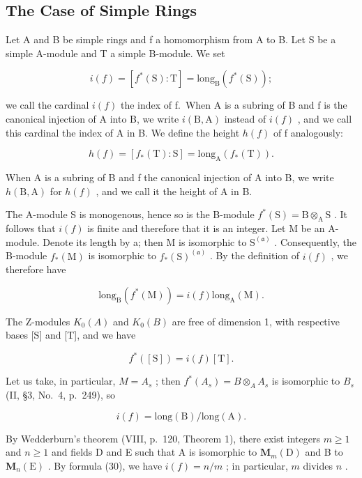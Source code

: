 \subsection{The Case of Simple Rings}

Let A and B be simple rings and f a homomorphism from A to B. Let S be a simple A-module and T a simple B-module. We set

\[
i (f) = [ f ^ {*} (\mathrm{S}): \mathrm{T} ] = \mathrm{long} _ {\mathrm{B}} (f ^ {*} (\mathrm{S}));\tag{26}
\]

we call the cardinal \(i(f)\) the index of f.~When A is a subring of B and f is the canonical injection of A into B, we write \(i(\mathrm{B},\mathrm{A})\) instead of \(i(f)\) , and we call this cardinal the index of A in B. We define the height \(h(f)\) of f analogously:

\[
h (f) = [ f _ {*} (\mathrm{T}): \mathrm{S} ] = \mathrm{long} _ {\mathrm{A}} (f _ {*} (\mathrm{T})).\tag{27}
\]

When A is a subring of B and f the canonical injection of A into B, we write \(h(\mathrm{B}, \mathrm{A})\) for \(h(f)\) , and we call it the height of A in B.

The A-module S is monogenous, hence so is the B-module \(f^{*}(\mathrm{S}) = \mathrm{B} \otimes_{\mathrm{A}} \mathrm{S}\) . It follows that \(i(f)\) is finite and therefore that it is an integer. Let M be an A-module. Denote its length by a; then M is isomorphic to \(\mathrm{S}^{(\mathfrak{a})}\) . Consequently, the B-module \(f_{*}(\mathrm{M})\) is isomorphic to \(f_{*}(\mathrm{S})^{(\mathfrak{a})}\) . By the definition of \(i(f)\) , we therefore have

\[
\mathrm{long} _ {\mathrm{B}} (f ^ {*} (\mathrm{M})) = i (f) \mathrm{long} _ {\mathrm{A}} (\mathrm{M}).\tag{28}
\]

The Z-modules \(K_{0}(A)\) and \(K_{0}(B)\) are free of dimension 1, with respective bases {[}S{]} and {[}T{]}, and we have

\[
f ^ {*} ([ \mathrm{S} ]) = i (f) [ \mathrm{T} ].\tag{29}
\]

Let us take, in particular, \(M = A_{s}\) ; then \(f^{*}(A_{s}) = B \otimes_{A} A_{s}\) is isomorphic to \(B_{s}\) (II, §3, No.~4, p.~249), so

\[
i (f) = \mathrm{long(B)} / \mathrm{long(A)}.\tag{30}
\]

By Wedderburn's theorem (VIII, p.~120, Theorem 1), there exist integers \(m \geqslant 1\) and \(n \geqslant 1\) and fields D and E such that A is isomorphic to \(\mathbf{M}_m(\mathrm{D})\) and B to \(\mathbf{M}_n(\mathrm{E})\) . By formula (30), we have \(i(f) = n / m\) ; in particular, \(m\) divides \(n\) .

